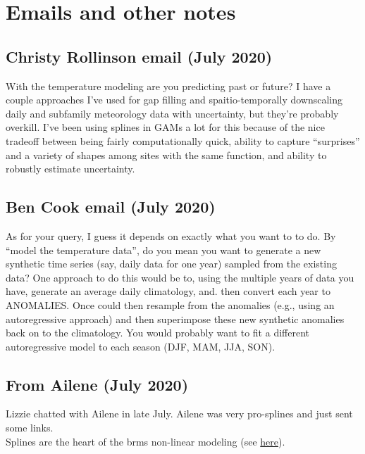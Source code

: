 \documentclass[11pt,letter]{article}
\begin{document}
\section{Emails and other notes}

\subsection{Christy Rollinson email (July 2020)}

With the temperature modeling are you predicting past or future?  I have a couple approaches I've used for gap filling and spaitio-temporally downscaling daily and subfamily meteorology data with uncertainty, but they're probably overkill.  I've been using splines in GAMs a lot for this because of the nice tradeoff between being fairly computationally quick, ability to capture ``surprises''  and a variety of shapes among sites with the same function, and ability to robustly estimate uncertainty.\\

\subsection{Ben Cook email (July 2020)}

As for your query, I guess it depends on exactly what you want to to do. By ``model the temperature data'', do you mean you want to generate a new synthetic time series (say, daily data for one year) sampled from the existing data? One approach to do this would be to, using the multiple years of data you have, generate an average daily climatology, and. then convert each year to ANOMALIES. Once could then resample from the anomalies (e.g., using an autoregressive approach) and then superimpose these new synthetic anomalies back on to the climatology. You would probably want to fit a different autoregressive model to each season (DJF, MAM, JJA, SON). \\

\subsection{From Ailene (July 2020)}
Lizzie chatted with Ailene in late July. Ailene was very pro-splines and just sent some links.\\

Splines are the heart of the brms non-linear modeling (see \href{https://mran.microsoft.com/snapshot/2017-05-14/web/packages/brms/vignettes/brms_multilevel.pdf}{here}).\\
\end{document}
